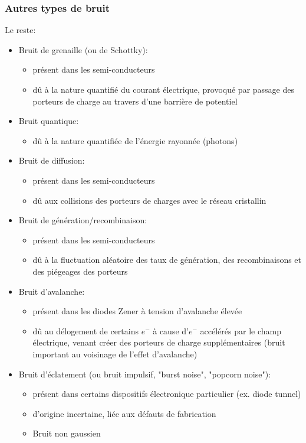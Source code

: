\subsubsection{Autres types de bruit}
Le reste:
\begin{itemize}
	\item Bruit de grenaille (ou de Schottky):
	\begin{itemize}
		\item présent dans les semi-conducteurs
		\item dû à la nature quantifié du courant électrique, provoqué par passage des porteurs de charge au travers d'une barrière de potentiel
	\end{itemize}
	\item Bruit quantique:
	\begin{itemize}
		\item dû à la nature quantifiée de l'énergie rayonnée (photons)
	\end{itemize}
	\item Bruit de diffusion:
	\begin{itemize}
		\item présent dans les semi-conducteurs
		\item dû aux collisions des porteurs de charges avec le réseau cristallin
	\end{itemize}
	\item Bruit de génération/recombinaison:
	\begin{itemize}
		\item présent dans les semi-conducteurs
		\item  dû à la fluctuation aléatoire des taux de génération, des recombinaisons et des piégeages des porteurs
	\end{itemize}
	\item Bruit d'avalanche:
	\begin{itemize}
		\item présent dans les diodes Zener à tension d'avalanche élevée
		\item  dû au délogement de certains \(e^-\) à cause d'\(e^-\) accélérés par le champ électrique, venant créer des porteurs de charge supplémentaires (bruit important au voisinage de l'effet d'avalanche)
	\end{itemize}
	\item Bruit d'éclatement (ou bruit impulsif, "burst noise", "popcorn noise"):
	\begin{itemize}
		\item présent dans certains dispositifs électronique particulier (ex. diode tunnel)
		\item d'origine incertaine, liée aux défauts de fabrication
		\item Bruit non gaussien
	\end{itemize}
\end{itemize}

